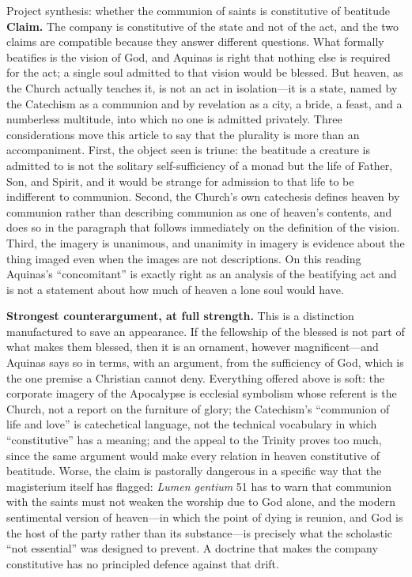 \begin{studybox}{Project synthesis: whether the communion of saints is constitutive of beatitude}
\textbf{Claim.} The company is constitutive of the state and not of the act, and the two claims are compatible because they answer different questions. What formally beatifies is the vision of God, and Aquinas is right that nothing else is required for the act; a single soul admitted to that vision would be blessed. But heaven, as the Church actually teaches it, is not an act in isolation---it is a state, named by the Catechism as a communion and by revelation as a city, a bride, a feast, and a numberless multitude, into which no one is admitted privately. Three considerations move this article to say that the plurality is more than an accompaniment. First, the object seen is triune: the beatitude a creature is admitted to is not the solitary self-sufficiency of a monad but the life of Father, Son, and Spirit, and it would be strange for admission to that life to be indifferent to communion. Second, the Church's own catechesis defines heaven by communion rather than describing communion as one of heaven's contents, and does so in the paragraph that follows immediately on the definition of the vision. Third, the imagery is unanimous, and unanimity in imagery is evidence about the thing imaged even when the images are not descriptions. On this reading Aquinas's ``concomitant'' is exactly right as an analysis of the beatifying act and is not a statement about how much of heaven a lone soul would have.

\smallskip
\textbf{Strongest counterargument, at full strength.} This is a distinction manufactured to save an appearance. If the fellowship of the blessed is not part of what makes them blessed, then it is an ornament, however magnificent---and Aquinas says so in terms, with an argument, from the sufficiency of God, which is the one premise a Christian cannot deny. Everything offered above is soft: the corporate imagery of the Apocalypse is ecclesial symbolism whose referent is the Church, not a report on the furniture of glory; the Catechism's ``communion of life and love'' is catechetical language, not the technical vocabulary in which ``constitutive'' has a meaning; and the appeal to the Trinity proves too much, since the same argument would make every relation in heaven constitutive of beatitude. Worse, the claim is pastorally dangerous in a specific way that the magisterium itself has flagged: \emph{Lumen gentium} 51 has to warn that communion with the saints must not weaken the worship due to God alone, and the modern sentimental version of heaven---in which the point of dying is reunion, and God is the host of the party rather than its substance---is precisely what the scholastic ``not essential'' was designed to prevent. A doctrine that makes the company constitutive has no principled defence against that drift.


\end{studybox}
